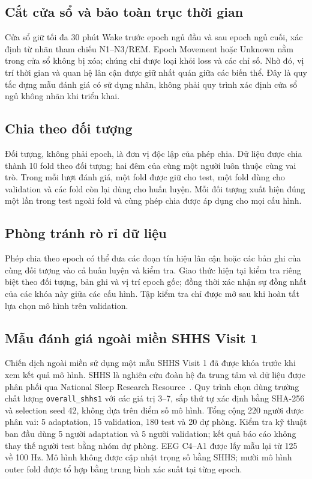 \subsection{Cắt cửa sổ và bảo toàn trục thời gian}

Cửa sổ giữ tối đa 30 phút Wake trước epoch ngủ đầu và sau epoch ngủ cuối, xác định từ nhãn tham chiếu N1--N3/REM. Epoch Movement hoặc Unknown nằm trong cửa sổ không bị xóa; chúng chỉ được loại khỏi loss và các chỉ số. Nhờ đó, vị trí thời gian và quan hệ lân cận được giữ nhất quán giữa các biến thể. Đây là quy tắc dựng mẫu đánh giá có sử dụng nhãn, không phải quy trình xác định cửa sổ ngủ không nhãn khi triển khai.

\subsection{Chia theo đối tượng}

Đối tượng, không phải epoch, là đơn vị độc lập của phép chia. Dữ liệu được chia thành 10 fold theo đối tượng; hai đêm của cùng một người luôn thuộc cùng vai trò. Trong mỗi lượt đánh giá, một fold được giữ cho test, một fold dùng cho validation và các fold còn lại dùng cho huấn luyện. Mỗi đối tượng xuất hiện đúng một lần trong test ngoài fold và cùng phép chia được áp dụng cho mọi cấu hình.

\subsection{Phòng tránh rò rỉ dữ liệu}

Phép chia theo epoch có thể đưa các đoạn tín hiệu lân cận hoặc các bản ghi của cùng đối tượng vào cả huấn luyện và kiểm tra. Giao thức hiện tại kiểm tra riêng biệt theo đối tượng, bản ghi và vị trí epoch gốc; đồng thời xác nhận sự đồng nhất của các khóa này giữa các cấu hình. Tập kiểm tra chỉ được mở sau khi hoàn tất lựa chọn mô hình trên validation.

\subsection{Mẫu đánh giá ngoài miền SHHS Visit 1}

Chiến dịch ngoài miền sử dụng một mẫu SHHS Visit 1 đã được khóa trước khi xem kết quả mô hình. SHHS là nghiên cứu đoàn hệ đa trung tâm và dữ liệu được phân phối qua National Sleep Research Resource~\cite{quan1997shhs,zhang2018nsrr}. Quy trình chọn dùng trường chất lượng \texttt{overall\_shhs1} với các giá trị 3--7, sắp thứ tự xác định bằng SHA-256 và selection seed 42, không dựa trên điểm số mô hình. Tổng cộng 220 người được phân vai: 5 adaptation, 15 validation, 180 test và 20 dự phòng. Kiểm tra kỹ thuật ban đầu dùng 5 người adaptation và 5 người validation; kết quả báo cáo không thay thế người test bằng nhóm dự phòng. EEG C4--A1 được lấy mẫu lại từ 125 về 100 Hz. Mô hình không được cập nhật trọng số bằng SHHS; mười mô hình outer fold được tổ hợp bằng trung bình xác suất tại từng epoch.


